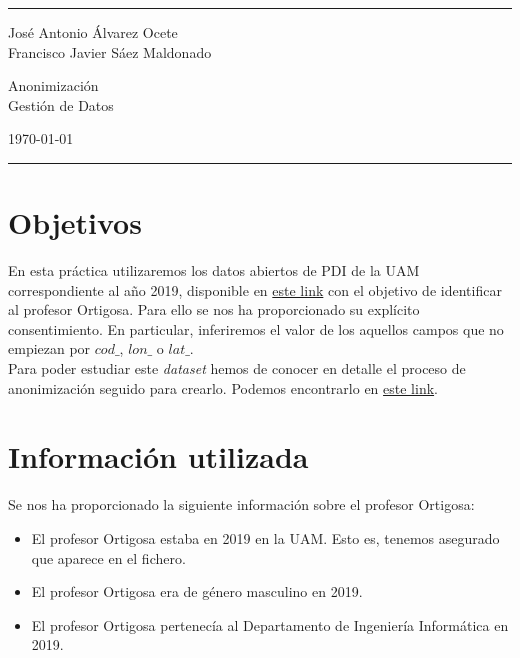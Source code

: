 \documentclass[a4paper]{article}
\begin{document}

\fancyhead[C]{}
\hrule \medskip %
\begin{minipage}{0.295\textwidth} 
	\raggedright
	\footnotesize
	José Antonio Álvarez Ocete \hfill\\   
	Francisco Javier Sáez Maldonado \hfill
\end{minipage}
\begin{minipage}{0.4\textwidth} 
	\centering 
	\large 
	Anonimización \\ 
	\normalsize 
	Gestión de Datos \\ 
\end{minipage}
\begin{minipage}{0.295\textwidth} 
	\raggedleft
	\today\hfill\\
\end{minipage}
\medskip\hrule 
\bigskip


\section{Objetivos}

En esta práctica utilizaremos los datos abiertos de PDI de la UAM correspondiente al año 2019, disponible en \href{https://www.universidata.es/datasets/uam-personal-pdi}{este link} con el objetivo de identificar al profesor Ortigosa. Para ello se nos ha proporcionado su explícito consentimiento. En particular, inferiremos el valor de los aquellos campos que no empiezan por $cod\_$, $lon\_$ o $lat\_$. \\

Para poder estudiar este \emph{dataset} hemos de conocer en detalle el proceso de anonimización seguido para crearlo. Podemos encontrarlo en \href{https://dimetrical.atlassian.net/wiki/spaces/UNC/pages/490799108/Dataset+Personal+Docente+e+Investigador+PDI}{este link}.

\section{Información utilizada}

Se nos ha proporcionado la siguiente información sobre el profesor Ortigosa:

\begin{itemize}
	\item El profesor Ortigosa estaba en 2019 en la UAM. Esto es, tenemos asegurado que aparece en el fichero.
	\item El profesor Ortigosa era de género masculino en 2019.
	\item El profesor Ortigosa pertenecía al Departamento de Ingeniería Informática en 2019.
\end{itemize}
\end{document}
